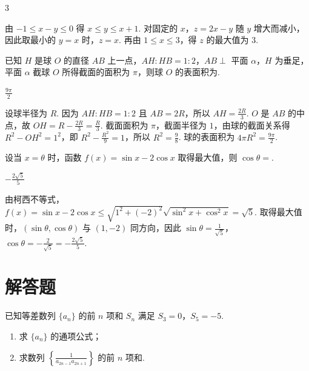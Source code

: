 \begin{answer}
3
\end{answer}

\begin{solution}
由 \(-1\leqslant x-y\leqslant0\) 得 \(x\leqslant y\leqslant x+1\). 对固定的 \(x\)，\(z=2x-y\) 随 \(y\) 增大而减小，因此取最小的 \(y=x\) 时，\(z=x\). 再由 \(1\leqslant x\leqslant3\)，得 \(z\) 的最大值为 \(3\).
\end{solution}

\begin{problem}
已知 \(H\) 是球 \(O\) 的直径 \(AB\) 上一点，\(AH:HB = 1:2\)，\(AB \perp\) 平面 \(\alpha\)，\(H\) 为垂足，平面 \(\alpha\) 截球 \(O\) 所得截面的面积为 \(\pi\)，则球 \(O\) 的表面积为\fillinblank{}.
\end{problem}

\begin{answer}
\(\frac{9\pi}{2}\)
\end{answer}

\begin{solution}
设球半径为 \(R\). 因为 \(AH:HB=1:2\) 且 \(AB=2R\)，所以 \(AH=\frac{2R}{3}\). \(O\) 是 \(AB\) 的中点，故 \(OH=R-\frac{2R}{3}=\frac{R}{3}\). 截面面积为 \(\pi\)，截面半径为 \(1\)，由球的截面关系得
\(\displaystyle R^2-OH^2=1^2\)，即 \(R^2-\frac{R^2}{9}=1\)，所以 \(R^2=\frac{9}{8}\). 球的表面积为 \(4\pi R^2=\frac{9\pi}{2}\).
\end{solution}

\begin{problem}
设当 \(x = \theta\) 时，函数 \(f(x) = \sin x - 2\cos x\) 取得最大值，则 \(\cos \theta =\)\fillinblank{}.
\end{problem}

\begin{answer}
\(-\frac{2\sqrt{5}}{5}\)
\end{answer}

\begin{solution}
由柯西不等式，
\(\displaystyle f(x)=\sin x-2\cos x\leqslant\sqrt{1^2+(-2)^2}\sqrt{\sin^2x+\cos^2x}=\sqrt{5}\). 取得最大值时，\((\sin\theta,\cos\theta)\) 与 \((1,-2)\) 同方向，因此 \(\sin\theta=\frac{1}{\sqrt{5}}\)，\(\cos\theta=-\frac{2}{\sqrt{5}}=-\frac{2\sqrt{5}}{5}\).
\end{solution}

\section{解答题}

\begin{problem}
已知等差数列 \(\{a_{n}\}\) 的前 \(n\) 项和 \(S_{n}\) 满足 \(S_{3} = 0\)，\(S_{5} = -5\).
\begin{enumerate}
\item 求 \( \{a_{n}\} \) 的通项公式；
\item 求数列 \(\left\{\frac{1}{a_{2n-1}a_{2n+1}}\right\}\) 的前 \(n\) 项和.
\end{enumerate}
\end{problem}

